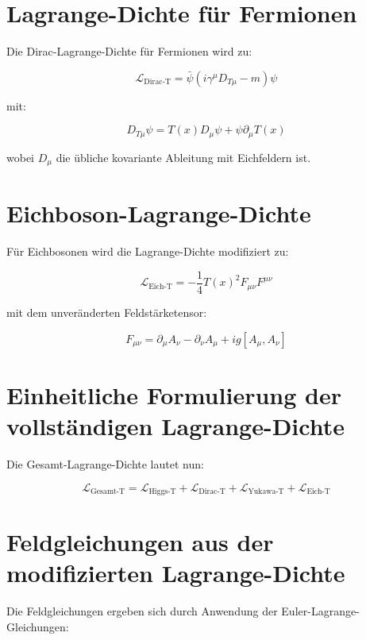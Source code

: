 \documentclass{article}
\begin{document}
	\section{Lagrange-Dichte für Fermionen}
	Die Dirac-Lagrange-Dichte für Fermionen wird zu:
	
	\begin{equation}
		\mathcal{L}_{\text{Dirac-T}} = \bar{\psi} (i \gamma^\mu D_{T\mu} - m) \psi
	\end{equation}
	
	mit:
	
	\begin{equation}
		D_{T\mu} \psi = T(x) D_\mu \psi + \psi \partial_\mu T(x)
	\end{equation}
	
	wobei \( D_\mu \) die übliche kovariante Ableitung mit Eichfeldern ist.
	
	\section{Eichboson-Lagrange-Dichte}
	Für Eichbosonen wird die Lagrange-Dichte modifiziert zu:
	
	\begin{equation}
		\mathcal{L}_{\text{Eich-T}} = -\frac{1}{4} T(x)^2 F_{\mu\nu} F^{\mu\nu}
	\end{equation}
	
	mit dem unveränderten Feldstärketensor:
	
	\begin{equation}
		F_{\mu\nu} = \partial_\mu A_\nu - \partial_\nu A_\mu + i g [A_\mu, A_\nu]
	\end{equation}
	
	\section{Einheitliche Formulierung der vollständigen Lagrange-Dichte}
	Die Gesamt-Lagrange-Dichte lautet nun:
	
	\begin{equation}
		\mathcal{L}_{\text{Gesamt-T}} = \mathcal{L}_{\text{Higgs-T}} + \mathcal{L}_{\text{Dirac-T}} + \mathcal{L}_{\text{Yukawa-T}} + \mathcal{L}_{\text{Eich-T}}
	\end{equation}
	
	\section{Feldgleichungen aus der modifizierten Lagrange-Dichte}
	Die Feldgleichungen ergeben sich durch Anwendung der Euler-Lagrange-Gleichungen:
	
\end{document}
